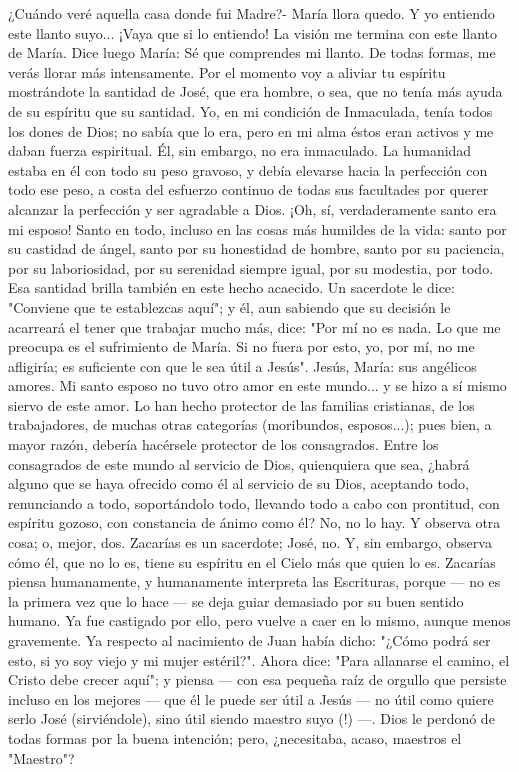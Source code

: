 \documentclass[12pt]{book} %
\begin{document}
¿Cuándo veré aquella casa donde fui Madre?- María llora quedo. Y yo entiendo este llanto suyo... ¡Vaya que si lo entiendo! La visión me termina con este llanto de María. 
Dice luego María: 
Sé que comprendes mi llanto. De todas formas, me verás llorar más intensamente. 
Por el momento voy a aliviar tu espíritu mostrándote la santidad de José, que era hombre, o sea, que no tenía más 
ayuda de su espíritu que su santidad. Yo, en mi condición de Inmaculada, tenía todos los dones de Dios; no sabía que lo era, pero en mi alma éstos eran activos y me daban fuerza espiritual. Él, sin embargo, no era inmaculado. La humanidad estaba en él con todo su peso gravoso, y debía elevarse hacia la perfección con todo ese peso, a costa del esfuerzo continuo de todas sus facultades por querer alcanzar la perfección y ser agradable a Dios. 
¡Oh, sí, verdaderamente santo era mi esposo! Santo en todo, incluso en las cosas más humildes de la vida: santo por su castidad de ángel, santo por su honestidad de hombre, santo por su paciencia, por su laboriosidad, por su serenidad siempre igual, por su modestia, por todo. 
Esa santidad brilla también en este hecho acaecido. Un sacerdote le dice: "Conviene que te establezcas aquí"; y él, aun sabiendo que su decisión le acarreará el tener que trabajar mucho más, dice: "Por mí no es nada. Lo que me preocupa es el sufrimiento de María. Si no fuera por esto, yo, por mí, no me afligiría; es suficiente con que le sea útil a Jesús". Jesús, María: sus angélicos amores. Mi santo esposo no tuvo otro amor en este mundo... y se hizo a sí mismo siervo de este amor. 
Lo han hecho protector de las familias cristianas, de los trabajadores, de muchas otras categorías (moribundos, 
esposos...); pues bien, a mayor razón, debería hacérsele protector de los consagrados. Entre los consagrados de este mundo al servicio de Dios, quienquiera que sea, ¿habrá alguno que se haya ofrecido como él al servicio de su Dios, aceptando todo, renunciando a todo, soportándolo todo, llevando todo a cabo con prontitud, con espíritu gozoso, con constancia de ánimo como él? No, no lo hay. 
Y observa otra cosa; o, mejor, dos. 
Zacarías es un sacerdote; José, no. Y, sin embargo, observa cómo él, que no lo es, tiene su espíritu en el Cielo más que quien lo es. Zacarías piensa humanamente, y humanamente interpreta las Escrituras, porque — no es la primera vez que lo hace — se deja guiar demasiado por su buen sentido humano. Ya fue castigado por ello, pero vuelve a caer en lo mismo, aunque menos gravemente. Ya respecto al nacimiento de Juan había dicho: "¿Cómo podrá ser esto, si yo soy viejo y mi mujer estéril?". Ahora dice: "Para allanarse el camino, el Cristo debe crecer aquí"; y piensa — con esa pequeña raíz de orgullo que persiste incluso en los mejores — que él le puede ser útil a Jesús — no útil como quiere serlo José (sirviéndole), sino útil siendo maestro suyo (!) —. Dios le perdonó de todas formas por la buena intención; pero, ¿necesitaba, acaso, maestros el "Maestro"? 
\end{document}
